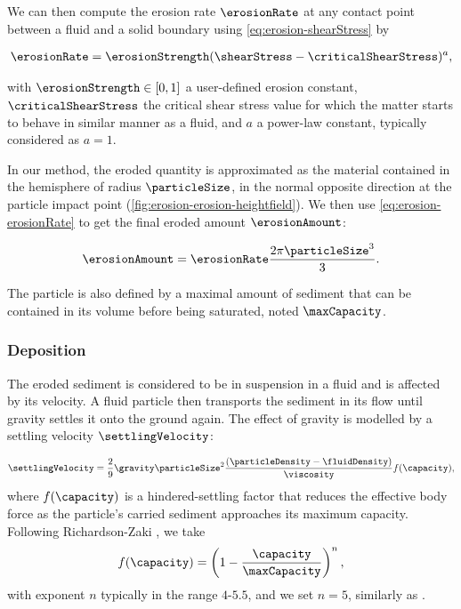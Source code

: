 We can then compute the erosion rate $\erosionRate$ at any contact point between a fluid and a solid boundary using \eqref{eq:erosion-shearStress} by 

\begin{align}
    \label{eq:erosion-erosionRate}
    \erosionRate = \erosionStrength (\shearStress - \criticalShearStress)^a,
\end{align}

with $\erosionStrength \in [0,1]$ a user-defined erosion constant, $\criticalShearStress$ the critical shear stress value for which the matter starts to behave in similar manner as a fluid, and $a$ a power-law constant, typically considered as $a = 1$. 

In our method, the eroded quantity is approximated as the material contained in the hemisphere of radius $\particleSize$, in the normal opposite direction at the particle impact point (\cref{fig:erosion-erosion-heightfield}). We then use \eqref{eq:erosion-erosionRate} to get the final eroded amount $\erosionAmount$: 

\begin{align}
    \label{eq:erosion-erosionAmount} 
    \erosionAmount = \erosionRate \frac{ 2 \pi \particleSize^3 }{ 3 }.
\end{align}

The particle is also defined by a maximal amount of sediment that can be contained in its volume before being saturated, noted $\maxCapacity$. %

\subsubsection{Deposition}
The eroded sediment is considered to be in suspension in a fluid and is affected by its velocity. A fluid particle then transports the sediment in its flow until gravity settles it onto the ground again. The effect of gravity is modelled by a settling velocity $\settlingVelocity$:

\begin{align} 
    \label{eq:erosion-initialSettlingVelocity}
    \settlingVelocity = \frac{ 2 }{ 9 }  \gravity \particleSize^2 \frac{(\particleDensity - \fluidDensity)}{\viscosity } f(\capacity),
\end{align} 
where $f(\capacity)$ is a hindered-settling factor that reduces the effective body force as the particle's carried sediment approaches its maximum capacity. Following Richardson-Zaki \cite{Richardson1954}, we take
\begin{align}
    \label{eq:erosion-Richardson}
    f(\capacity) = \left(1 - \frac{\capacity}{\maxCapacity}\right)^{n},
\end{align}
with exponent $n$ typically in the range $4$-$5.5$, and we set $n=5$, similarly as \cite{Wojtan2007}.

